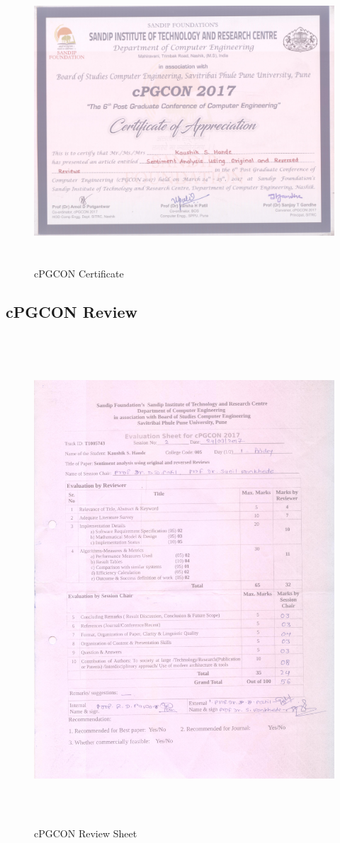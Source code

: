 \documentclass[oneside,a4paper,12pt]{pictreport}
\begin{document}
\begin{figure}[!h]
\includegraphics[width=5.5in,height=4.2in]{6107_certificate.jpg}
\caption{cPGCON Certificate}
\end{figure}

\newpage
\subsection{cPGCON Review}
\begin{figure}[!h]
\includegraphics[width=5.5in,height=7.2in]{6107_reviewsheet.jpg}
\caption{cPGCON Review Sheet}
\end{figure}
\end{document}
